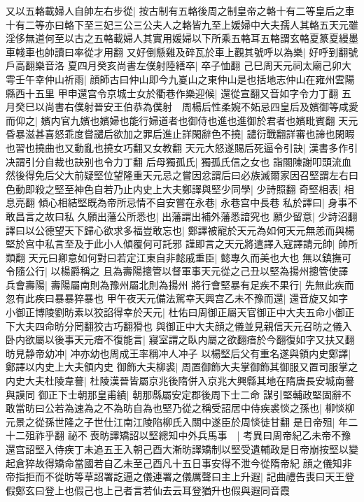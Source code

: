又以五輅載婦人自帥左右步從|{
	按古制有五輅後周之制皇帝之輅十有二等皇后之車十有二等亦曰輅下至三妃三公三公夫人之輅皆九至上媛婦中大夫孺人其輅五天元雖淫侈無道何至以古之五輅載婦人其實用媛婦以下所乘五輅耳五輅謂玄輅夏篆夏縵墨車輚車也帥讀曰率從才用翻}
又好倒懸雞及碎瓦於車上觀其號呼以為樂|{
	好呼到翻號戶高翻樂音洛}
夏四月癸亥尚書左僕射陸繕卒|{
	卒子恤翻}
己巳周天元祠太廟己卯大雩壬午幸仲山祈雨|{
	顔師古曰仲山即今九嵏山之東仲山是也括地志仲山在雍州雲陽縣西十五里}
甲申還宫令京城士女於衢巷作樂迎候|{
	還從宣翻又音如字令力丁翻}
五月癸巳以尚書右僕射晉安王伯恭為僕射　周楊后性柔婉不妬忌四皇后及嬪御等咸愛而仰之|{
	嬪内官九嬪也嬪婦也能行婦道者也御侍也進也進御於君者也嬪毗賓翻}
天元昏暴滋甚喜怒乖度嘗譴后欲加之罪后進止詳閑辭色不撓|{
	譴衍戰翻詳審也諦也閑暇也習也撓曲也又動亂也撓女巧翻又女教翻}
天元大怒遂賜后死逼令引訣|{
	漢書多作引决謂引分自裁也訣别也令力丁翻}
后母獨孤氏|{
	獨孤氏信之女也}
詣閤陳謝叩頭流血然後得免后父大前疑堅位望隆重天元忌之嘗因忿謂后曰必族滅爾家因召堅謂左右曰色動即殺之堅至神色自若乃止内史上大夫鄭譯與堅少同學|{
	少詩照翻}
奇堅相表|{
	相息亮翻}
傾心相結堅既為帝所忌情不自安嘗在永巷|{
	永巷宫中長巷}
私於譯曰|{
	身事不敢昌言之故曰私}
久願出藩公所悉也|{
	出藩謂出補外藩悉諳究也}
願少留意|{
	少詩沼翻}
譯曰以公德望天下歸心欲求多福豈敢忘也|{
	鄭譯被寵於天元為如何天元無恙而與楊堅於宫中私言至及于此小人傾覆何可託邪}
謹即言之天元將遣譯入寇譯請元帥|{
	帥所類翻}
天元曰卿意如何對曰若定江東自非懿戚重臣|{
	懿專久而美也大也}
無以鎮撫可令隨公行|{
	以楊爵稱之}
且為壽陽摠管以督軍事天元從之己丑以堅為揚州摠管使譯兵會壽陽|{
	壽陽屬南則為豫州屬北則為揚州}
將行會堅暴有足疾不果行|{
	先無此疾而忽有此疾曰暴暴猝暴也}
甲午夜天元備法駕幸天興宫乙未不豫而還|{
	還音旋又如字}
小御正博陵劉昉素以狡諂得幸於天元|{
	杜佑曰周御正屬天官御正中大夫五命小御正下大夫四命昉分罔翻狡古巧翻猾也}
與御正中大夫顔之儀並見親信天元召昉之儀入卧内欲屬以後事天元瘖不復能言|{
	寢室謂之臥内屬之欲翻瘖於今翻復如字又扶又翻}
昉見静帝幼冲|{
	冲亦幼也周成王率稱冲人冲子}
以楊堅后父有重名遂與領内史鄭譯|{
	鄭譯以内史上大夫領内史}
御飾大夫柳裘|{
	周置御飾大夫掌御飾其御服又置司服掌之}
内史大夫杜陵韋謩|{
	杜陵漢晉皆屬京兆後隋併入京兆大興縣其地在隋唐長安城南謩與謨同}
御正下士朝那皇甫績|{
	朝那縣屬安定郡後周下士二命}
謀引堅輔政堅固辭不敢當昉曰公若為速為之不為昉自為也堅乃從之稱受詔居中侍疾裘惔之孫也|{
	柳惔柳元景之從孫世隆之子世仕江南江陵陷柳氏入關中遂臣於周惔徒甘翻}
是日帝殂|{
	年二十二殂祚乎翻}
祕不喪昉譯矯詔以堅總知中外兵馬事　|{
	考異曰周帝紀乙未帝不豫還宫詔堅入侍疾丁未追五王入朝己酉大漸昉譯矯制以堅受遺輔政是日帝崩按堅以變起倉猝故得矯命當國若自乙未至己酉凡十五日事安得不泄今從隋帝紀}
顔之儀知非帝指拒而不從昉等草詔署訖逼之儀連署之儀厲聲曰主上升遐|{
	記曲禮告喪曰天王登假鄭玄曰登上也假己也上己者言若仙去云耳登猶升也假與遐同音霞}
